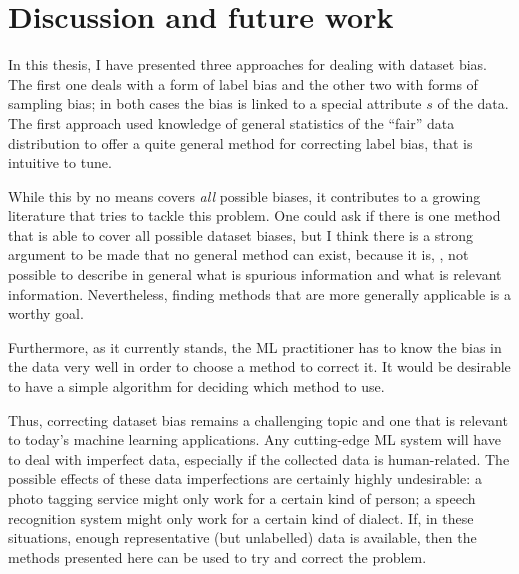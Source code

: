 \chapter{Discussion and future work}\label{ch:conclusion}
In this thesis, I have presented three approaches for dealing with dataset bias.
The first one deals with a form of label bias and the other two with forms of sampling bias;
in both cases the bias is linked to a special attribute \(s\) of the data.
%
%
The first approach used knowledge of general statistics of the ``fair'' data distribution to offer a quite general method for correcting label bias,
that is intuitive to tune.

While this by no means covers \emph{all} possible biases,
it contributes to a growing literature that tries to tackle this problem.
One could ask if there is one method that is able to cover all possible dataset biases,
but I think there is a strong argument to be made that no general method can exist,
because it is, \eg, not possible to describe in general what is spurious information and what is relevant information.
Nevertheless, finding methods that are more generally applicable is a worthy goal.

Furthermore, as it currently stands,
the \ac{ML} practitioner has to know the bias in the data very well in order to choose a method to correct it.
It would be desirable to have a simple algorithm for deciding which method to use.

Thus, correcting dataset bias remains a challenging topic
and one that is relevant to today's machine learning applications.
Any cutting-edge \ac{ML} system will have to deal with imperfect data,
especially if the collected data is human-related.
The possible effects of these data imperfections are certainly highly undesirable:
a photo tagging service might only work for a certain kind of person;
a speech recognition system might only work for a certain kind of dialect.
If, in these situations, enough representative (but unlabelled) data is available,
then the methods presented here can be used to try and correct the problem.

